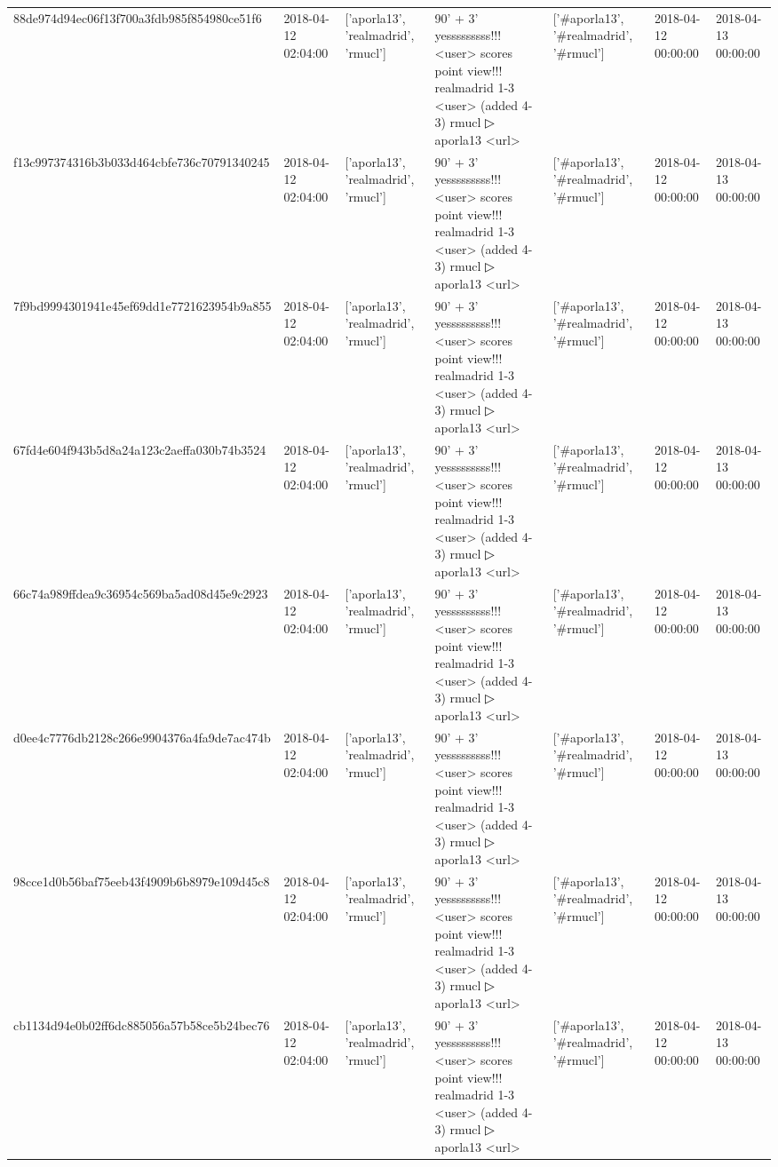 \begin{tabular}{lllllll}
88de974d94ec06f13f700a3fdb985f854980ce51f6 & 2018-04-12 02:04:00 & ['aporla13', 'realmadrid', 'rmucl'] & 90' + 3' yesssssssss!!! <user> scores point view!!! realmadrid 1-3 <user> (added 4-3) rmucl ▷ aporla13 <url> & ['#aporla13', '#realmadrid', '#rmucl'] & 2018-04-12 00:00:00 & 2018-04-13 00:00:00 \\
f13c997374316b3b033d464cbfe736c70791340245 & 2018-04-12 02:04:00 & ['aporla13', 'realmadrid', 'rmucl'] & 90' + 3' yesssssssss!!! <user> scores point view!!! realmadrid 1-3 <user> (added 4-3) rmucl ▷ aporla13 <url> & ['#aporla13', '#realmadrid', '#rmucl'] & 2018-04-12 00:00:00 & 2018-04-13 00:00:00 \\
7f9bd9994301941e45ef69dd1e7721623954b9a855 & 2018-04-12 02:04:00 & ['aporla13', 'realmadrid', 'rmucl'] & 90' + 3' yesssssssss!!! <user> scores point view!!! realmadrid 1-3 <user> (added 4-3) rmucl ▷ aporla13 <url> & ['#aporla13', '#realmadrid', '#rmucl'] & 2018-04-12 00:00:00 & 2018-04-13 00:00:00 \\
67fd4e604f943b5d8a24a123c2aeffa030b74b3524 & 2018-04-12 02:04:00 & ['aporla13', 'realmadrid', 'rmucl'] & 90' + 3' yesssssssss!!! <user> scores point view!!! realmadrid 1-3 <user> (added 4-3) rmucl ▷ aporla13 <url> & ['#aporla13', '#realmadrid', '#rmucl'] & 2018-04-12 00:00:00 & 2018-04-13 00:00:00 \\
66c74a989ffdea9c36954c569ba5ad08d45e9c2923 & 2018-04-12 02:04:00 & ['aporla13', 'realmadrid', 'rmucl'] & 90' + 3' yesssssssss!!! <user> scores point view!!! realmadrid 1-3 <user> (added 4-3) rmucl ▷ aporla13 <url> & ['#aporla13', '#realmadrid', '#rmucl'] & 2018-04-12 00:00:00 & 2018-04-13 00:00:00 \\
d0ee4c7776db2128c266e9904376a4fa9de7ac474b & 2018-04-12 02:04:00 & ['aporla13', 'realmadrid', 'rmucl'] & 90' + 3' yesssssssss!!! <user> scores point view!!! realmadrid 1-3 <user> (added 4-3) rmucl ▷ aporla13 <url> & ['#aporla13', '#realmadrid', '#rmucl'] & 2018-04-12 00:00:00 & 2018-04-13 00:00:00 \\
98cce1d0b56baf75eeb43f4909b6b8979e109d45c8 & 2018-04-12 02:04:00 & ['aporla13', 'realmadrid', 'rmucl'] & 90' + 3' yesssssssss!!! <user> scores point view!!! realmadrid 1-3 <user> (added 4-3) rmucl ▷ aporla13 <url> & ['#aporla13', '#realmadrid', '#rmucl'] & 2018-04-12 00:00:00 & 2018-04-13 00:00:00 \\
cb1134d94e0b02ff6dc885056a57b58ce5b24bec76 & 2018-04-12 02:04:00 & ['aporla13', 'realmadrid', 'rmucl'] & 90' + 3' yesssssssss!!! <user> scores point view!!! realmadrid 1-3 <user> (added 4-3) rmucl ▷ aporla13 <url> & ['#aporla13', '#realmadrid', '#rmucl'] & 2018-04-12 00:00:00 & 2018-04-13 00:00:00 \\

\end{tabular}
